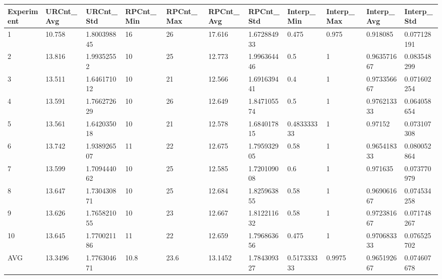 \begin{table}[H]
\begin{adjustbox}{max width=380pt,keepaspectratio,angle=90}
\begin{tabular}{|l|l|l|l|l|l|l|l|l|l|l|}
				\end{tabular}
			\end{adjustbox}
			\begin{adjustbox}{max width=380pt,keepaspectratio,angle=90}
				\begin{tabular}{|l|l|l|l|l|l|l|l|l|l|l|}
					\hline
					\rowcolor[HTML]{EFEFEF} 
					Experiment & URCnt\_Avg & URCnt\_Std  & RPCnt\_Min & RPCnt\_Max & RPCnt\_Avg & RPCnt\_Std  & Interp\_Min & Interp\_Max & Interp\_Avg & Interp\_Std \\ \hline
					1          & 10.758     & 1.800398845 & 16         & 26         & 17.616     & 1.672884933 & 0.475       & 0.975       & 0.918085    & 0.077128191 \\ \hline
					2          & 13.816     & 1.99352552  & 10         & 25         & 12.773     & 1.996364446 & 0.5         & 1           & 0.963571667 & 0.083548299 \\ \hline
					3          & 13.511     & 1.646171012 & 10         & 21         & 12.566     & 1.691639441 & 0.4         & 1           & 0.973356667 & 0.071602254 \\ \hline
					4          & 13.591     & 1.766272629 & 10         & 26         & 12.649     & 1.847105574 & 0.5         & 1           & 0.976213333 & 0.064058654 \\ \hline
					5          & 13.561     & 1.642035018 & 10         & 21         & 12.578     & 1.684017815 & 0.483333333 & 1           & 0.97152     & 0.073107308 \\ \hline
					6          & 13.742     & 1.938926507 & 11         & 22         & 12.675     & 1.795932905 & 0.58        & 1           & 0.965418333 & 0.080052864 \\ \hline
					7          & 13.599     & 1.709444062 & 10         & 25         & 12.585     & 1.720109008 & 0.6         & 1           & 0.971635    & 0.073770979 \\ \hline
					8          & 13.647     & 1.730430871 & 10         & 25         & 12.684     & 1.825963855 & 0.58        & 1           & 0.969061667 & 0.074534258 \\ \hline
					9          & 13.626     & 1.765821055 & 10         & 23         & 12.667     & 1.812211632 & 0.58        & 1           & 0.972381667 & 0.071748267 \\ \hline
					10         & 13.645     & 1.770021186 & 11         & 22         & 12.659     & 1.796863656 & 0.475       & 1           & 0.970683333 & 0.076525702 \\ \hline
					AVG        & 13.3496    & 1.776304671 & 10.8       & 23.6       & 13.1452    & 1.784309327 & 0.517333333 & 0.9975      & 0.965192667 & 0.074607678 \\ \hline
				\end{tabular}
			\end{adjustbox}	
		\end{table}


